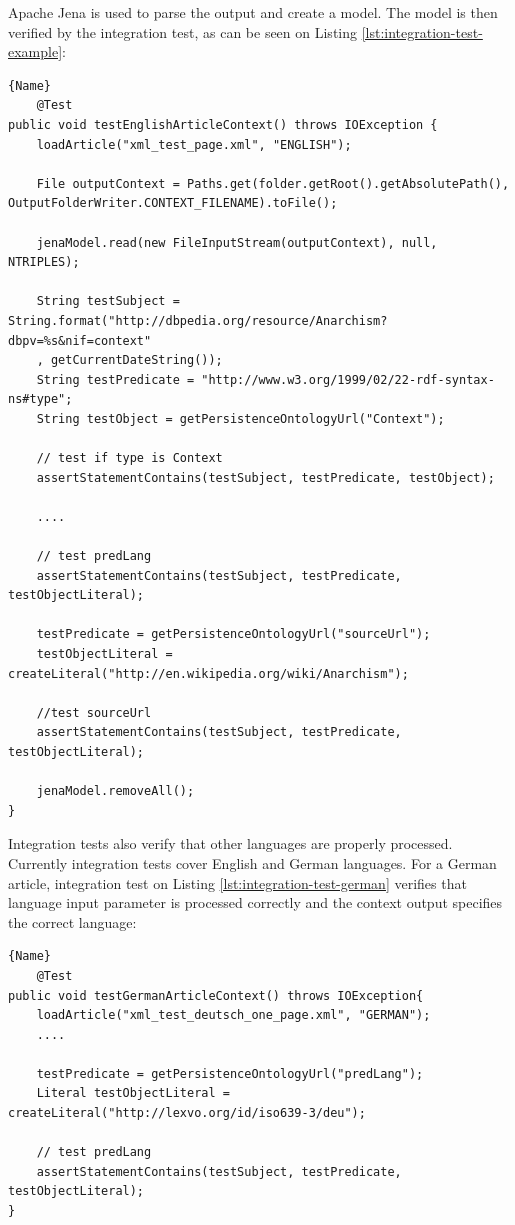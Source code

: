 \documentclass[thesis=M,english,hidelinks]{FITthesis}[2019/12/23]
\begin{document}
Apache Jena is used to parse the output and create a model. The model is then verified by the integration test, as can be seen on Listing \ref{lst:integration-test-example}:

\begin{lstlisting}[caption=Integration Testing - English Article Context,frame=tlrb,  label = {lst:integration-test-example}]{Name}
    @Test
public void testEnglishArticleContext() throws IOException {
	loadArticle("xml_test_page.xml", "ENGLISH");
	
	File outputContext = Paths.get(folder.getRoot().getAbsolutePath(), OutputFolderWriter.CONTEXT_FILENAME).toFile();
	
	jenaModel.read(new FileInputStream(outputContext), null, NTRIPLES);
	
	String testSubject = String.format("http://dbpedia.org/resource/Anarchism?dbpv=%s&nif=context"
	, getCurrentDateString());
	String testPredicate = "http://www.w3.org/1999/02/22-rdf-syntax-ns#type";
	String testObject = getPersistenceOntologyUrl("Context");
	
	// test if type is Context
	assertStatementContains(testSubject, testPredicate, testObject);
		
	....
	
	// test predLang
	assertStatementContains(testSubject, testPredicate, testObjectLiteral);
	
	testPredicate = getPersistenceOntologyUrl("sourceUrl");
	testObjectLiteral = createLiteral("http://en.wikipedia.org/wiki/Anarchism");
	
	//test sourceUrl
	assertStatementContains(testSubject, testPredicate, testObjectLiteral);
	
	jenaModel.removeAll();
}
\end{lstlisting}

Integration tests also verify that other languages are properly processed. Currently integration tests cover English and German languages. For a German article, integration test on Listing \ref{lst:integration-test-german} verifies that language input parameter is processed correctly and the context output specifies the correct language:

\begin{lstlisting}[caption=Integration Testing - German Article Context,frame=tlrb,  label = {lst:integration-test-german}]{Name}
    @Test
public void testGermanArticleContext() throws IOException{
	loadArticle("xml_test_deutsch_one_page.xml", "GERMAN");
	....
	
	testPredicate = getPersistenceOntologyUrl("predLang");
	Literal testObjectLiteral = createLiteral("http://lexvo.org/id/iso639-3/deu");
	
	// test predLang
	assertStatementContains(testSubject, testPredicate, testObjectLiteral);
}
\end{lstlisting}
\end{document}
